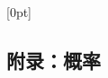 \appendix


[0pt]{\addvspace{1.5pt}\filright\bf}%
        {}%
        {}{\contentspage}

\renewcommand{\chaptermark}[1]{\markboth{\begin{CJK}{UTF8}{gkai}#1\end{CJK}}{}}
\renewcommand{\sectionmark}[1]{\markright{\thesection\, #1}}

\begin{CJK}{UTF8}{gkai}
    \chapter{附录：概率}
\end{CJK}